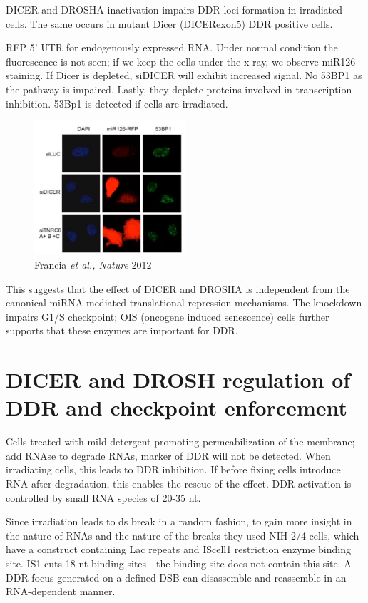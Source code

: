 DICER and DROSHA inactivation impairs DDR loci formation in irradiated cells. The same occurs in mutant Dicer (DICERexon5) DDR positive cells.

RFP 5' UTR for endogenously expressed RNA. Under normal condition the fluorescence is not seen; if we keep the cells under the x-ray, we observe miR126 staining. If Dicer is depleted, siDICER will exhibit increased signal. No 53BP1 as the pathway is impaired. Lastly, they deplete proteins involved in transcription inhibition. 53Bp1 is detected if cells are irradiated.

\begin{figure}
\centering
\includegraphics[width=0.5\textwidth]{Screen_Shot_2022-12-07_at_08-59-12.png}
\caption{Francia \emph{et al., Nature} 2012}
\end{figure}

This suggests that the effect of DICER and DROSHA is independent from the canonical miRNA-mediated translational repression mechanisms. The knockdown impairs G1/S checkpoint; OIS (oncogene induced senescence) cells further supports that these enzymes are important for DDR.

\hypertarget{dicer-and-drosh-regulation-of-ddr-and-checkpoint-enforcement}{%
\section{DICER and DROSH regulation of DDR and checkpoint enforcement}\label{dicer-and-drosh-regulation-of-ddr-and-checkpoint-enforcement}}

Cells treated with mild detergent promoting permeabilization of the membrane; add RNAse to degrade RNAs, marker of DDR will not be detected. When irradiating cells, this leads to DDR inhibition. If before fixing cells introduce RNA after degradation, this enables the rescue of the effect. DDR activation is controlled by small RNA species of 20-35 nt.

Since irradiation leads to ds break in a random fashion, to gain more insight in the nature of RNAs and the nature of the breaks they used NIH 2/4 cells, which have a construct containing Lac repeats and IScell1 restriction enzyme binding site. IS1 cuts 18 nt binding sites - the binding site does not contain this site. A DDR focus generated on a defined DSB can disassemble and reassemble in an RNA-dependent manner.

